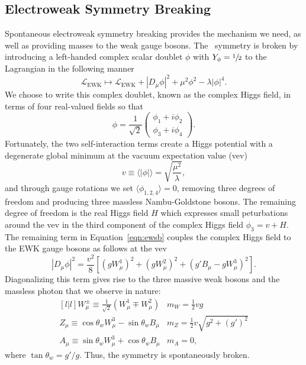 \subsection{Electroweak Symmetry Breaking}
\label{subsec:ewsb}

Spontaneous electroweak symmetry breaking provides the mechanism we need, as well as providing masses to the weak gauge bosons. The \sutwo\ symmetry is broken by introducing a left-handed complex scalar doublet $\phi$ with $Y_\phi = \sfrac{1}{2}$ to the Lagrangian in the following manner
\begin{equation}
  \label{eqn:ewsb}
  \mathcal{L}_{\text{EWK}} \mapsto \mathcal{L}_{\text{EWK}} + \left|D_\mu \phi \right|^2 + \mu^2 \phi^2 - \lambda \left| \phi \right|^4 .
\end{equation}
We choose to write this complex doublet, known as the complex Higgs field, in terms of four real-valued fields so that
\begin{equation}
  \phi = \frac{1}{\sqrt{2}} \begin{pmatrix} \phi_1 + i \phi_2 \\ \phi_3 + i\phi_4 \end{pmatrix} .
\end{equation}
Fortunately, the two self-interaction terms create a Higgs potential with a degenerate global minimum at the vacuum expectation value (vev)
\begin{equation}
  v \equiv \langle | \phi | \rangle = \sqrt{ \frac{\mu^2}{\lambda}},
\end{equation}
and through gauge rotations we set $\langle \phi_{1,2,4} \rangle = 0$, removing three degrees of freedom and producing three massless Nambu-Goldstone bosons. The remaining degree of freedom is the real Higgs field $H$ which expresses small peturbations around the vev in the third component of the complex Higgs field $\phi_3 = v + H$. The remaining term in Equation~\ref{eqn:ewsb} couples the complex Higgs field to the EWK gauge bosons as follows at the vev
\begin{equation}
  \left| D_\mu \phi \right|^2 = \frac{v^2}{8} \left[ \left(g W_\mu^1 \right)^2 + \left(g W_\mu^2 \right)^2 + \left(g' B_\mu - g W_\mu^3 \right)^2 \right].
\end{equation}
Diagonalizing this term gives rise to the three massive weak bosons and the massless photon that we observe in nature:
\begin{equation}
  \begin{matrix}[l | l]
    W_\mu^{\pm} \equiv \frac{1}{\sqrt{2}} \left( W_\mu^1 \mp W_\mu^2 \right)
    & m_W = \frac{1}{2} vg \\
    Z_\mu \equiv \cos \theta_w W_\mu^3 - \sin \theta_w B_\mu
    & m_Z = \frac{1}{2} v \sqrt{g^2 + (g')^2} \\
    A_\mu \equiv \sin \theta_w W_\mu^3 + \cos \theta_w B_\mu
    & m_A = 0,
  \end{matrix}
\end{equation}
where $\tan \theta_w = g'/g$. Thus, the symmetry is spontaneously broken.


